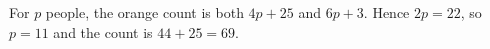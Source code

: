 For $p$ people, the orange count is both $4p+25$ and $6p+3$. Hence $2p=22$, so $p=11$ and the count is $44+25=\boxed{69}$.
